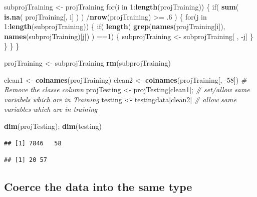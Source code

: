 \documentclass[]{article}
\newenvironment{Shaded}{\begin{snugshade}}{\end{snugshade}}
\newcommand{\KeywordTok}[1]{\textcolor[rgb]{0.13,0.29,0.53}{\textbf{{#1}}}}
\newcommand{\DecValTok}[1]{\textcolor[rgb]{0.00,0.00,0.81}{{#1}}}
\newcommand{\StringTok}[1]{\textcolor[rgb]{0.31,0.60,0.02}{{#1}}}
\newcommand{\CommentTok}[1]{\textcolor[rgb]{0.56,0.35,0.01}{\textit{{#1}}}}
\newcommand{\NormalTok}[1]{{#1}}
\begin{document}
\begin{Shaded}
\begin{Highlighting}[]
\NormalTok{subprojTraining <-}\StringTok{ }\NormalTok{projTraining }
\NormalTok{for(i in }\DecValTok{1}\NormalTok{:}\KeywordTok{length}\NormalTok{(projTraining)) \{ }
  \NormalTok{if( }\KeywordTok{sum}\NormalTok{( }\KeywordTok{is.na}\NormalTok{( projTraining[, i] ) ) /}\KeywordTok{nrow}\NormalTok{(projTraining) >=}\StringTok{ }\NormalTok{.}\DecValTok{6} \NormalTok{) \{ }
    \NormalTok{for(j in }\DecValTok{1}\NormalTok{:}\KeywordTok{length}\NormalTok{(subprojTraining)) \{}
      \NormalTok{if( }\KeywordTok{length}\NormalTok{( }\KeywordTok{grep}\NormalTok{(}\KeywordTok{names}\NormalTok{(projTraining[i]), }\KeywordTok{names}\NormalTok{(subprojTraining)[j]) ) ==}\DecValTok{1}\NormalTok{)  \{ }
        \NormalTok{subprojTraining <-}\StringTok{ }\NormalTok{subprojTraining[ , -j] }
      \NormalTok{\}   }
    \NormalTok{\} }
  \NormalTok{\}}
\NormalTok{\}}

\NormalTok{projTraining <-}\StringTok{ }\NormalTok{subprojTraining}
\KeywordTok{rm}\NormalTok{(subprojTraining)}

\NormalTok{clean1 <-}\StringTok{ }\KeywordTok{colnames}\NormalTok{(projTraining)}
\NormalTok{clean2 <-}\StringTok{ }\KeywordTok{colnames}\NormalTok{(projTraining[, -}\DecValTok{58}\NormalTok{]) }\CommentTok{# Remove the classe column }
\NormalTok{projTesting <-}\StringTok{ }\NormalTok{projTesting[clean1]; }\CommentTok{# set/allow same variabels which are in Training}
\NormalTok{testing <-}\StringTok{ }\NormalTok{testingdata[clean2] }\CommentTok{# allow same variables which are in training}

\KeywordTok{dim}\NormalTok{(projTesting); }\KeywordTok{dim}\NormalTok{(testing)}
\end{Highlighting}
\end{Shaded}

\begin{verbatim}
## [1] 7846   58
\end{verbatim}

\begin{verbatim}
## [1] 20 57
\end{verbatim}

\subsection{Coerce the data into the same
type}\label{coerce-the-data-into-the-same-type}
\end{document}
